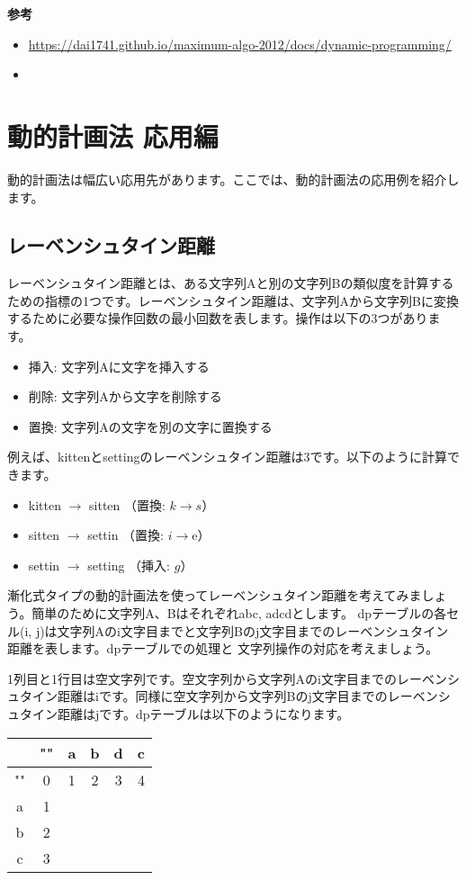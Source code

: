 \documentclass{jlreq}
\begin{document}
\textbf{参考}
\begin{itemize}
  \item \url{https://dai1741.github.io/maximum-algo-2012/docs/dynamic-programming/}
  \item \url{}
\end{itemize}

\section{動的計画法 応用編}
動的計画法は幅広い応用先があります。ここでは、動的計画法の応用例を紹介します。
\subsection{レーベンシュタイン距離}
レーベンシュタイン距離とは、ある文字列Aと別の文字列Bの類似度を計算するための指標の1つです。レーベンシュタイン距離は、文字列Aから文字列Bに変換するために必要な操作回数の最小回数を表します。操作は以下の3つがあります。

\begin{itemize}
  \item 挿入: 文字列Aに文字を挿入する
  \item 削除: 文字列Aから文字を削除する
  \item 置換: 文字列Aの文字を別の文字に置換する
\end{itemize}

例えば、kittenとsettingのレーベンシュタイン距離は3です。以下のように計算できます。

\begin{itemize}
  \item kitten $\to$ sitten （置換: $k \to s$）
  \item sitten $\to$ settin （置換: $i \to $e）
  \item settin $\to$ setting （挿入: $g$）
\end{itemize}

漸化式タイプの動的計画法を使ってレーベンシュタイン距離を考えてみましょう。簡単のために文字列A、Bはそれぞれabc, adcdとします。
dpテーブルの各セル(i, j)は文字列Aのi文字目までと文字列Bのj文字目までのレーベンシュタイン距離を表します。dpテーブルでの処理と
文字列操作の対応を考えましょう。

1列目と1行目は空文字列です。空文字列から文字列Aのi文字目までのレーベンシュタイン距離はiです。同様に空文字列から文字列Bのj文字目までのレーベンシュタイン距離はjです。dpテーブルは以下のようになります。

\begin{table}[h]
  \centering
  \begin{tabular}{|c|c|c|c|c|c|}
    \hline
    & "" & a & b & d  & c\\
    \hline
    "" & 0 & 1 & 2 & 3 & 4\\
    \hline
    a & 1 &  &  &  & \\
    \hline
    b & 2 &  &  &  & \\
    \hline
    c & 3 &  &  &  & \\
    \hline
  \end{tabular}
\end{table}
\end{document}
